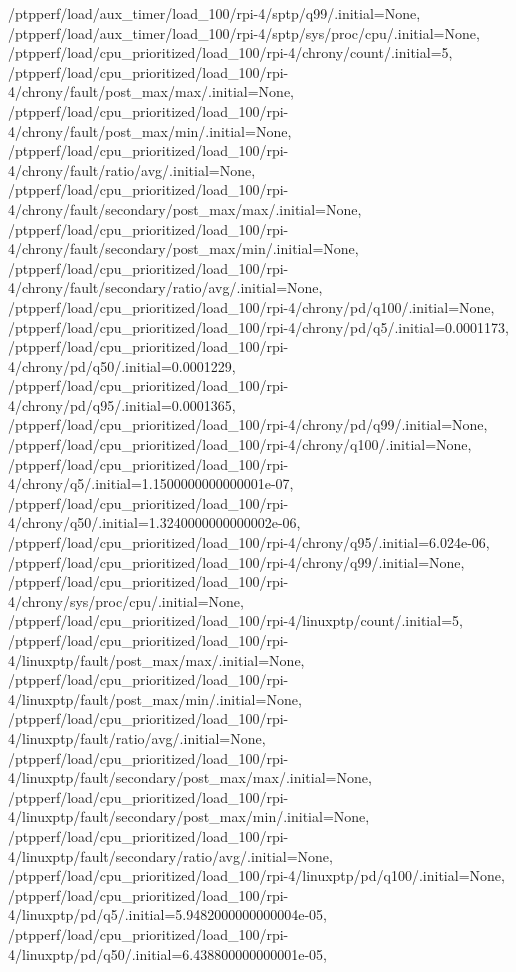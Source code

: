 {    /ptpperf/load/aux_timer/load_100/rpi-4/sptp/q99/.initial=None,
    /ptpperf/load/aux_timer/load_100/rpi-4/sptp/sys/proc/cpu/.initial=None,
    /ptpperf/load/cpu_prioritized/load_100/rpi-4/chrony/count/.initial=5,
    /ptpperf/load/cpu_prioritized/load_100/rpi-4/chrony/fault/post_max/max/.initial=None,
    /ptpperf/load/cpu_prioritized/load_100/rpi-4/chrony/fault/post_max/min/.initial=None,
    /ptpperf/load/cpu_prioritized/load_100/rpi-4/chrony/fault/ratio/avg/.initial=None,
    /ptpperf/load/cpu_prioritized/load_100/rpi-4/chrony/fault/secondary/post_max/max/.initial=None,
    /ptpperf/load/cpu_prioritized/load_100/rpi-4/chrony/fault/secondary/post_max/min/.initial=None,
    /ptpperf/load/cpu_prioritized/load_100/rpi-4/chrony/fault/secondary/ratio/avg/.initial=None,
    /ptpperf/load/cpu_prioritized/load_100/rpi-4/chrony/pd/q100/.initial=None,
    /ptpperf/load/cpu_prioritized/load_100/rpi-4/chrony/pd/q5/.initial=0.0001173,
    /ptpperf/load/cpu_prioritized/load_100/rpi-4/chrony/pd/q50/.initial=0.0001229,
    /ptpperf/load/cpu_prioritized/load_100/rpi-4/chrony/pd/q95/.initial=0.0001365,
    /ptpperf/load/cpu_prioritized/load_100/rpi-4/chrony/pd/q99/.initial=None,
    /ptpperf/load/cpu_prioritized/load_100/rpi-4/chrony/q100/.initial=None,
    /ptpperf/load/cpu_prioritized/load_100/rpi-4/chrony/q5/.initial=1.1500000000000001e-07,
    /ptpperf/load/cpu_prioritized/load_100/rpi-4/chrony/q50/.initial=1.3240000000000002e-06,
    /ptpperf/load/cpu_prioritized/load_100/rpi-4/chrony/q95/.initial=6.024e-06,
    /ptpperf/load/cpu_prioritized/load_100/rpi-4/chrony/q99/.initial=None,
    /ptpperf/load/cpu_prioritized/load_100/rpi-4/chrony/sys/proc/cpu/.initial=None,
    /ptpperf/load/cpu_prioritized/load_100/rpi-4/linuxptp/count/.initial=5,
    /ptpperf/load/cpu_prioritized/load_100/rpi-4/linuxptp/fault/post_max/max/.initial=None,
    /ptpperf/load/cpu_prioritized/load_100/rpi-4/linuxptp/fault/post_max/min/.initial=None,
    /ptpperf/load/cpu_prioritized/load_100/rpi-4/linuxptp/fault/ratio/avg/.initial=None,
    /ptpperf/load/cpu_prioritized/load_100/rpi-4/linuxptp/fault/secondary/post_max/max/.initial=None,
    /ptpperf/load/cpu_prioritized/load_100/rpi-4/linuxptp/fault/secondary/post_max/min/.initial=None,
    /ptpperf/load/cpu_prioritized/load_100/rpi-4/linuxptp/fault/secondary/ratio/avg/.initial=None,
    /ptpperf/load/cpu_prioritized/load_100/rpi-4/linuxptp/pd/q100/.initial=None,
    /ptpperf/load/cpu_prioritized/load_100/rpi-4/linuxptp/pd/q5/.initial=5.9482000000000004e-05,
    /ptpperf/load/cpu_prioritized/load_100/rpi-4/linuxptp/pd/q50/.initial=6.438800000000001e-05,
}
